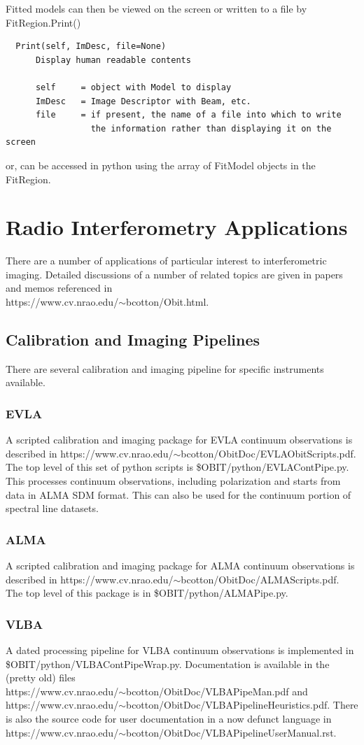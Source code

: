 \documentclass[11pt]{report}
\begin{document}
Fitted models can then be viewed on the screen or written to a file by
FitRegion.Print()
\begin{verbatim}
  Print(self, ImDesc, file=None)
      Display human readable contents
      
      self     = object with Model to display
      ImDesc   = Image Descriptor with Beam, etc.
      file     = if present, the name of a file into which to write
                 the information rather than displaying it on the screen
\end{verbatim}
or, can be accessed in python using the array of FitModel objects in
the FitRegion.


\section{Radio Interferometry Applications}
There are a number of applications of particular interest to
interferometric imaging.
Detailed discussions of a number of related topics are given in papers
and memos referenced in \\ https://www.cv.nrao.edu/$\sim$bcotton/Obit.html.
\subsection{Calibration and Imaging Pipelines}
There are several calibration and imaging pipeline for specific
instruments available.
\subsubsection{EVLA}
A scripted calibration and imaging package for EVLA continuum observations
is  described in
https://www.cv.nrao.edu/$\sim$bcotton/ObitDoc/EVLAObitScripts.pdf.
The top level of this set of python scripts is
\$OBIT/python/EVLAContPipe.py.
This processes continuum observations, including polarization and
starts from data in ALMA SDM format.  
This can also be used for the continuum portion of spectral line datasets.

\subsubsection{ALMA}
A scripted calibration and imaging package for ALMA continuum observations
is  described in https://www.cv.nrao.edu/$\sim$bcotton/ObitDoc/ALMAScripts.pdf.
The top level of this package is in \$OBIT/python/ALMAPipe.py.

\subsubsection{VLBA}
A dated processing pipeline for VLBA continuum observations is implemented
in \\
\$OBIT/python/VLBAContPipeWrap.py.
Documentation is available in the (pretty old) files \\
https://www.cv.nrao.edu/$\sim$bcotton/ObitDoc/VLBAPipeMan.pdf and\\
https://www.cv.nrao.edu/$\sim$bcotton/ObitDoc/VLBAPipelineHeuristics.pdf.
There is also the source code for user documentation in a now defunct
language in\\
https://www.cv.nrao.edu/$\sim$bcotton/ObitDoc/VLBAPipelineUserManual.rst.
\end{document}
